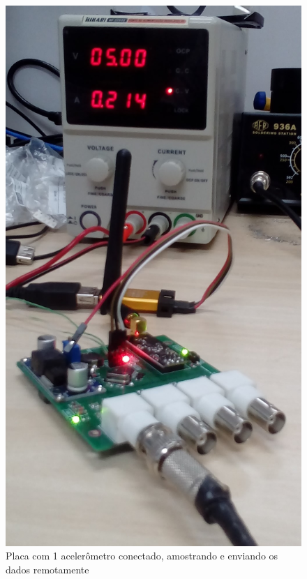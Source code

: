 \documentclass[11pt]{abntex2}
\begin{document}
\begin{figure}[H]
\begin{minipage}{0.4\linewidth}
						\includegraphics[width = .92\linewidth]{../Fotos/consumo1.jpg}
						\caption[Placa com 1 acelerômetro]{Placa com 1 acelerômetro conectado, amostrando e enviando os dados remotamente}
					\end{minipage}
				\end{figure}
					
\end{document}
